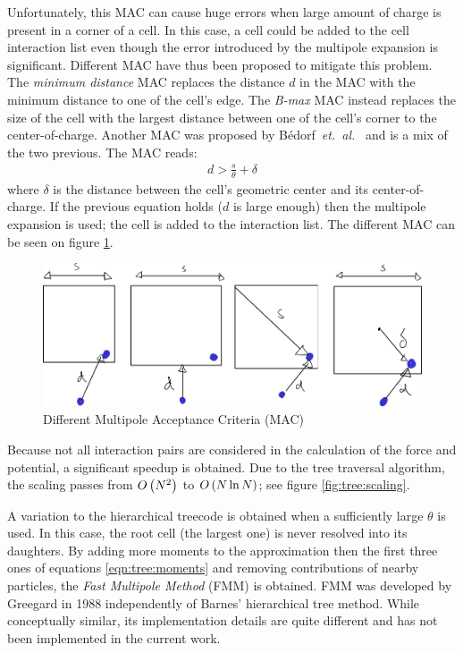 Unfortunately, this MAC can cause huge errors when large amount of charge is
present in a corner of a cell\cite{Pfalzner1996}.
In this case, a cell could be added to the cell
interaction list even though the error introduced by the multipole expansion is
significant. Different MAC have thus been proposed to mitigate this problem.
The \textit{minimum distance} MAC replaces the distance $d$ in the MAC with the
minimum distance to one of the cell's edge. The \textit{B-max} MAC instead
replaces the size of the cell with the largest distance between one of the
cell's corner to the center-of-charge. Another MAC was proposed by
B\'edorf~\textit{et.~al.}~\cite{Bedorf2012} and is a mix of the two previous.
The MAC reads:
\begin{align}
d > \frac{s}{\theta} + \delta
\end{align}
where $\delta$ is the distance between the cell's geometric center and its
center-of-charge. If the previous equation holds ($d$ is large enough) then the
multipole expansion is used; the cell is added to the interaction list.
The different MAC can be seen on figure \ref{fig:tree:mac}.

\begin{figure}
 \centering
 \includegraphics[width=0.8\columnwidth]{figures/mockups/mac}
 \caption{Different Multipole Acceptance Criteria (MAC)}
 \label{fig:tree:mac}
\end{figure}

Because not all interaction pairs are considered in the calculation of the
force and potential, a significant speedup is obtained. Due to the tree
traversal algorithm, the scaling passes\cite{Barnes1986,Gibbon2002,Pfalzner1996}
from $O\left( N^2 \right)$ to $O\left( N \ln{N} \right)$; see figure \ref{fig:tree:scaling}.


A variation to the hierarchical treecode is obtained when a sufficiently large
$\theta$ is used. In this case, the root cell (the largest one) is never
resolved into its daughters. By adding more moments to the approximation then
the first three ones of equations \eqref{eqn:tree:moments} and removing
contributions of nearby particles, the \textit{Fast Multipole Method} (FMM) is
obtained\cite{Pfalzner1996}. FMM was developed by Greegard in
1988\cite{Greengard1987} independently of Barnes' hierarchical tree method.
While conceptually similar, its implementation details are quite different and
has not been implemented in the current work.




